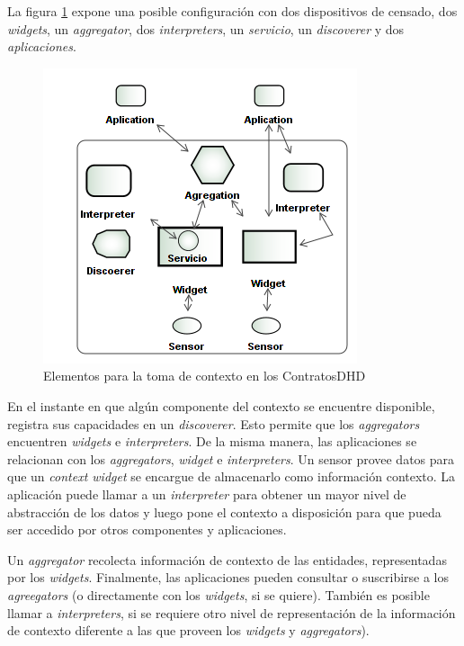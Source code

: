 \begin{itemize}
La figura \ref{fig:toolkit} expone una posible configuración con dos dispositivos de censado, dos \textit{widgets}, un \textit{aggregator}, dos \textit{interpreters}, un \textit{servicio}, un \textit{discoverer} y dos \textit{aplicaciones}.


\begin{figure}
\begin{center}
 \includegraphics [width=5 in,totalheight=2 in]{Ch4/ContextToolsKit.png}
\caption{Elementos para la toma de contexto en los ContratosDHD}
\label{fig:toolkit}
\end{center}
\end{figure}


En el instante en que algún componente del contexto se encuentre disponible, registra sus capacidades en un \textit{discoverer}. Esto permite que los \textit{aggregators} encuentren \textit{widgets} e \textit{interpreters}. De la misma manera, las aplicaciones se relacionan con los \textit{aggregators}, \textit{widget} e \textit{interpreters}. Un sensor provee datos para que un \textit{context widget} se encargue de almacenarlo como información contexto. La aplicación puede llamar a un \textit{interpreter} para obtener un mayor nivel de abstracción de los datos y luego pone el contexto a disposición para que pueda ser accedido por otros componentes y aplicaciones.

Un \textit{aggregator} recolecta información de contexto de las entidades, representadas por los \textit{widgets}. Finalmente, las aplicaciones pueden consultar o suscribirse a los \textit{agreegators} (o directamente con los \textit{widgets}, si se quiere). También es posible llamar a \textit{interpreters}, si se requiere otro nivel de representación de la información de contexto diferente a las que proveen los \textit{widgets} y \textit{aggregators}).


\end{itemize}
